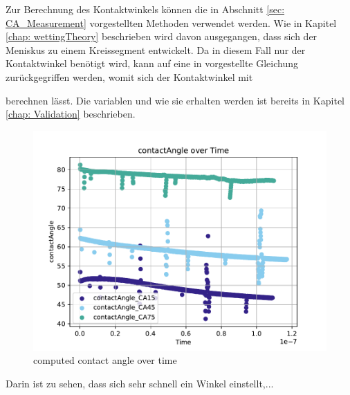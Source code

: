 Zur Berechnung des Kontaktwinkels können die in Abschnitt \ref*{sec: CA_Measurement} vorgestellten Methoden verwendet werden. Wie in Kapitel \ref*{chap: wettingTheory} beschrieben wird davon ausgegangen, dass sich der Meniskus zu einem Kreissegment entwickelt. Da in diesem Fall nur der Kontaktwinkel benötigt wird, kann auf eine in \cite{buttPhysicsChemistryInterfaces} vorgestellte Gleichung zurückgegriffen werden, womit sich der Kontaktwinkel mit 

berechnen lässt. Die variablen und wie sie erhalten werden ist bereits in Kapitel \ref*{chap: Validation} beschrieben. 
\begin{figure}[h]
    \centering
    \includegraphics[width=.95\textwidth]{Pictures/contactAngle_overTime.pdf}
    \caption{computed contact angle over time }
    \label{fig: CA_overTime}
\end{figure}
Darin ist zu sehen, dass sich sehr schnell ein Winkel einstellt,... 






